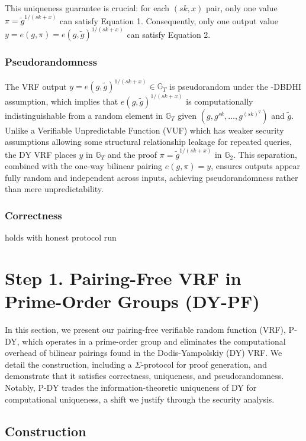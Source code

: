 This uniqueness guarantee is crucial: for each $(sk,x)$ pair, only one value $\pi = \tilde{g}^{1/(sk+x)}$ can satisfy Equation 1. Consequently, only one output value $y = e(g, \pi) = e(g, \tilde{g})^{1/(sk+x)}$ can satisfy Equation 2.


\subsubsection*{Pseudorandomness}
The VRF output $ y = e(g, \tilde{g})^{1/(sk + x)} \in \mathbb{G}_T $ is pseudorandom under the $ $-DBDHI assumption, which implies that $ e(g, \tilde{g})^{1/(sk + x)} $ is computationally indistinguishable from a random element in $ \mathbb{G}_T $ given $ (g, g^{sk}, \ldots, g^{(sk)^q}) $ and $ \tilde{g} $. Unlike a Verifiable Unpredictable Function (VUF) which has weaker security assumptions allowing some structural relationship leakage for repeated queries, the DY VRF places $ y $ in $ \mathbb{G}_T $ and the proof $ \pi = \tilde{g}^{1/(sk + x)} $ in $ \mathbb{G}_2 $. This separation, combined with the one-way bilinear pairing $ e(g, \pi) = y $, ensures outputs appear fully random and independent across inputs, achieving pseudorandomness rather than mere unpredictability.


\subsubsection*{Correctness} holds with honest protocol run





\section{Step 1. Pairing-Free VRF in Prime-Order Groups (DY-PF)}\label{sec-dy-pf}

In this section, we present our pairing-free verifiable random function (VRF), P-DY, which operates in a prime-order group and eliminates the computational overhead of bilinear pairings found in the Dodis-Yampolskiy (DY) VRF. We detail the construction, including a $\Sigma$-protocol for proof generation, and demonstrate that it satisfies correctness, uniqueness, and pseudorandomness. Notably, P-DY trades the information-theoretic uniqueness of DY for computational uniqueness, a shift we justify through the security analysis.

\subsection{Construction}


